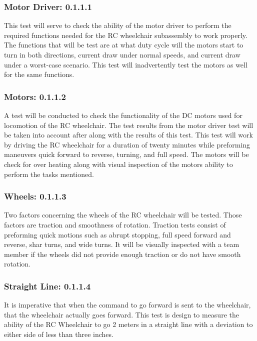 \documentclass[conference]{IEEEtran}
\begin{document}
        \subsubsection{Motor Driver: 0.1.1.1}
        This test will serve to check the ability of the motor driver to perform the required functions needed for the RC wheelchair subassembly to work properly. The functions that will be test are at what duty cycle will the motors start to turn in both directions, current draw under normal speeds, and current draw under a worst-case scenario. This test will inadvertently test the motors as well for the same functions.

        \subsubsection{Motors: 0.1.1.2}
         A test will be conducted to check the functionality of the DC motors used for locomotion of the RC wheelchair. The test results from the motor driver test will be taken into account after along with the results of this test. This test will work by driving the RC wheelchair for a duration of twenty minutes while preforming maneuvers quick forward to reverse, turning, and full speed. The motors will be check for over heating along with visual inspection of the motors ability to perform the tasks mentioned.

        \subsubsection{Wheels: 0.1.1.3}
       Two factors concerning the wheels of the RC wheelchair will be tested. Those factors are traction and smoothness of rotation. Traction tests consist of preforming quick motions such as abrupt stopping, full speed forward and reverse, shar turns, and wide turns. It will be visually inspected with a team member if the wheels did not provide enough traction or do not have smooth rotation. 

        \subsubsection{Straight Line: 0.1.1.4}
        It is imperative that when the command to go forward is sent to the wheelchair, that the wheelchair actually goes forward. This test is design to measure the ability of the RC Wheelchair to go 2 meters in a straight line with a deviation to either side of less than three inches. 
\end{document}
